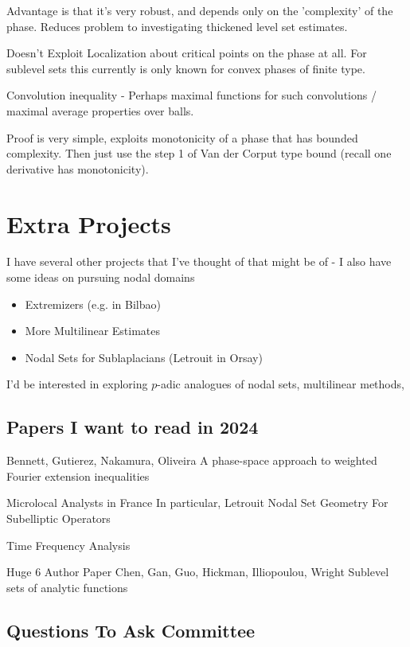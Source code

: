 \documentclass[11pt]{article}
\begin{document}
Advantage is that it's very robust, and depends only on the 'complexity' of the phase. Reduces problem to investigating thickened level set estimates.

Doesn't Exploit Localization about critical points on the phase at all. For sublevel sets this currently is only known for convex phases of finite type.

Convolution inequality - Perhaps maximal functions for such convolutions / maximal average properties over balls.

Proof is very simple, exploits monotonicity of a phase that has bounded complexity. Then just use the step 1 of Van der Corput type bound (recall one derivative has monotonicity).

\section{Extra Projects}

I have several other projects that I've thought of that might be of - I also have some ideas on pursuing nodal domains 

\begin{itemize}
    \item Extremizers (e.g. in Bilbao)
    \item More Multilinear Estimates
    \item Nodal Sets for Sublaplacians (Letrouit in Orsay)
\end{itemize}

I'd be interested in exploring $p$-adic analogues of nodal sets, multilinear methods,

\subsection{Papers I want to read in 2024}

    Bennett, Gutierez, Nakamura, Oliveira 
        A phase-space approach to weighted Fourier extension inequalities

    Microlocal Analysts in France
        In particular, Letrouit Nodal Set Geometry For Subelliptic Operators

    Time Frequency Analysis

    Huge 6 Author Paper Chen, Gan, Guo, Hickman, Illiopoulou, Wright
        Sublevel sets of analytic functions

\subsection{Questions To Ask Committee}
\end{document}
